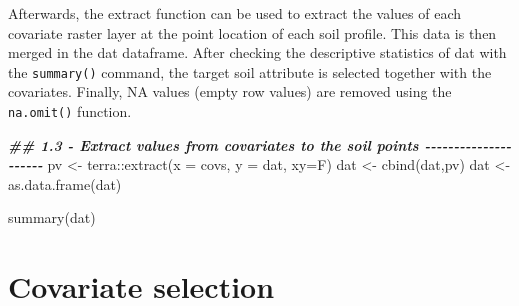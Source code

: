 \documentclass[
  10pt,
  b5paper,
  oneside]{book}
\newenvironment{Shaded}{\begin{snugshade}}{\end{snugshade}}
\newcommand{\AttributeTok}[1]{\textcolor[rgb]{0.77,0.63,0.00}{#1}}
\newcommand{\DocumentationTok}[1]{\textcolor[rgb]{0.56,0.35,0.01}{\textbf{\textit{#1}}}}
\newcommand{\FunctionTok}[1]{\textcolor[rgb]{0.00,0.00,0.00}{#1}}
\newcommand{\NormalTok}[1]{#1}
\newcommand{\OtherTok}[1]{\textcolor[rgb]{0.56,0.35,0.01}{#1}}
\newcommand{\SpecialCharTok}[1]{\textcolor[rgb]{0.00,0.00,0.00}{#1}}
\begin{document}
Afterwards, the extract function can be used to extract the values of each covariate raster layer at the point location of each soil profile. This data is then merged in the dat dataframe. After checking the descriptive statistics of dat with the \texttt{summary()} command, the target soil attribute is selected together with the covariates. Finally, NA values (empty row values) are removed using the \texttt{na.omit()} function.

\begin{Shaded}
\begin{Highlighting}[]
\DocumentationTok{\#\# 1.3 {-} Extract values from covariates to the soil points {-}{-}{-}{-}{-}{-}{-}{-}{-}{-}{-}{-}{-}{-}{-}{-}{-}{-}{-}{-}{-}}
\NormalTok{pv }\OtherTok{\textless{}{-}}\NormalTok{ terra}\SpecialCharTok{::}\FunctionTok{extract}\NormalTok{(}\AttributeTok{x =}\NormalTok{ covs, }\AttributeTok{y =}\NormalTok{ dat, }\AttributeTok{xy=}\NormalTok{F)}
\NormalTok{dat }\OtherTok{\textless{}{-}} \FunctionTok{cbind}\NormalTok{(dat,pv)}
\NormalTok{dat }\OtherTok{\textless{}{-}} \FunctionTok{as.data.frame}\NormalTok{(dat)}

\FunctionTok{summary}\NormalTok{(dat)}
\end{Highlighting}
\end{Shaded}

\hypertarget{covariate-selection}{%
\section{Covariate selection}\label{covariate-selection}}
\end{document}
